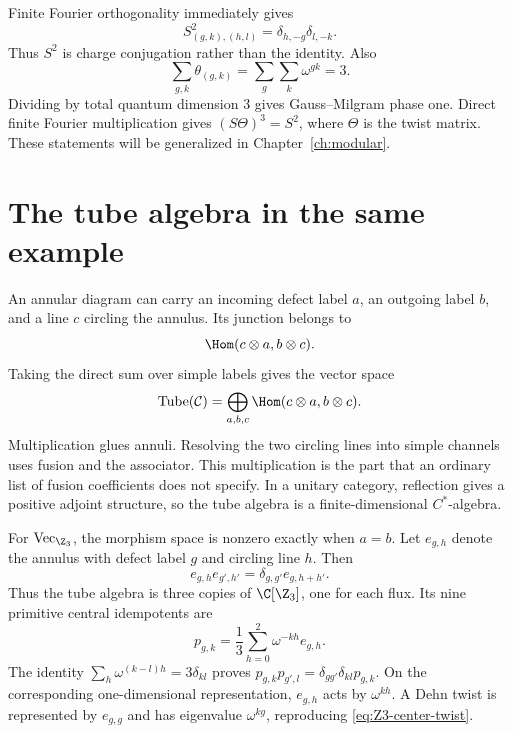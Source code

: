 Finite Fourier orthogonality immediately gives
\[
 S^2_{(g,k),(h,l)}=\delta_{h,-g}\delta_{l,-k}.
\]
Thus $S^2$ is charge conjugation rather than the identity.  Also
\[
 \sum_{g,k}\theta_{(g,k)}=\sum_g\sum_k\omega^{gk}=3.
\]
Dividing by total quantum dimension $3$ gives Gauss--Milgram phase
one.  Direct finite Fourier multiplication gives $(S\Theta)^3=S^2$,
where $\Theta$ is the twist matrix.  These statements will be
generalized in Chapter~\ref{ch:modular}.

\section{The tube algebra in the same example}

An annular diagram can carry an incoming defect label $a$, an
outgoing label $b$, and a line $c$ circling the annulus.  Its junction
belongs to
\[
 \Hom(c\otimes a,b\otimes c).
\]
Taking the direct sum over simple labels gives the vector space
\begin{equation}
 \operatorname{Tube}(\mathcal C)
 =\bigoplus_{a,b,c}\Hom(c\otimes a,b\otimes c).
 \label{eq:tube-vector-space}
\end{equation}
Multiplication glues annuli.  Resolving the two circling lines into
simple channels uses fusion and the associator.  This multiplication
is the part that an ordinary list of fusion coefficients does not
specify.  In a unitary category, reflection gives a positive adjoint
structure, so the tube algebra is a finite-dimensional $C^*$-algebra.

For $\operatorname{Vec}_{\Z_3}$, the morphism space is nonzero
exactly when $a=b$.  Let $e_{g,h}$ denote the annulus with defect
label $g$ and circling line $h$.  Then
\begin{equation}
 e_{g,h}e_{g',h'}=\delta_{g,g'}e_{g,h+h'}.
 \label{eq:Z3-tube-product}
\end{equation}
Thus the tube algebra is three copies of $\C[\Z_3]$, one for
each flux.  Its nine primitive central idempotents are
\begin{equation}
 p_{g,k}=\frac13\sum_{h=0}^2\omega^{-kh}e_{g,h}.
 \label{eq:Z3-tube-projector}
\end{equation}
The identity
$\sum_h\omega^{(k-l)h}=3\delta_{kl}$ proves
$p_{g,k}p_{g',l}=\delta_{gg'}\delta_{kl}p_{g,k}$.
On the corresponding one-dimensional representation,
$e_{g,h}$ acts by $\omega^{kh}$.  A Dehn twist is represented by
$e_{g,g}$ and has eigenvalue $\omega^{kg}$, reproducing
\eqref{eq:Z3-center-twist}.

